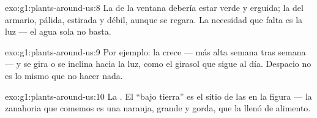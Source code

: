 \begin{solution}{exo:g1:plants-around-us:8}
La  de la ventana debería estar verde y erguida; la del armario,
pálida, estirada y débil, aunque se regara. La necesidad que falta es
la luz --- el agua sola no basta.
\end{solution}

\begin{solution}{exo:g1:plants-around-us:9}
Por ejemplo: la  crece --- más alta semana tras semana --- y se
gira o se inclina hacia la luz, como el girasol que sigue al día.
Despacio no es lo mismo que no hacer nada.
\end{solution}

\begin{solution}{exo:g1:plants-around-us:10}
La . El ``bajo tierra'' es el sitio de las  en la figura ---
la zanahoria que comemos es una  naranja, grande y gorda, que la
 llenó de alimento.
\end{solution}
